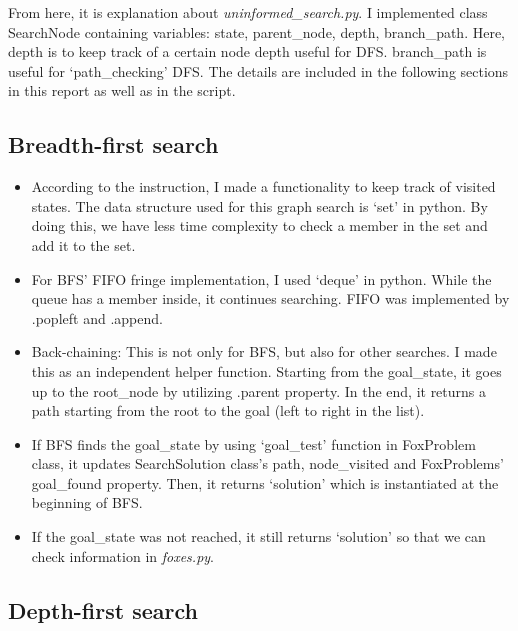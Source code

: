 \documentclass[]{article}
\providecommand{\tightlist}{%
  \setlength{\itemsep}{0pt}\setlength{\parskip}{0pt}}
\begin{document}
From here, it is explanation about \emph{uninformed\_search.py}. I
implemented class SearchNode containing variables: state, parent\_node,
depth, branch\_path. Here, depth is to keep track of a certain node
depth useful for DFS. branch\_path is useful for `path\_checking' DFS.
The details are included in the following sections in this report as
well as in the script.

\subsection{Breadth-first search}\label{breadth-first-search}

\begin{itemize}
\tightlist
\item
  According to the instruction, I made a functionality to keep track of
  visited states. The data structure used for this graph search is `set'
  in python. By doing this, we have less time complexity to check a
  member in the set and add it to the set.
\item
  For BFS' FIFO fringe implementation, I used `deque' in python. While
  the queue has a member inside, it continues searching. FIFO was
  implemented by .popleft and .append.
\item
  Back-chaining: This is not only for BFS, but also for other searches.
  I made this as an independent helper function. Starting from the
  goal\_state, it goes up to the root\_node by utilizing .parent
  property. In the end, it returns a path starting from the root to the
  goal (left to right in the list).
\item
  If BFS finds the goal\_state by using `goal\_test' function in
  FoxProblem class, it updates SearchSolution class's path,
  node\_visited and FoxProblems' goal\_found property. Then, it returns
  `solution' which is instantiated at the beginning of BFS.
\item
  If the goal\_state was not reached, it still returns `solution' so
  that we can check information in \emph{foxes.py}.
\end{itemize}

\subsection{Depth-first search}\label{depth-first-search}
\end{document}
